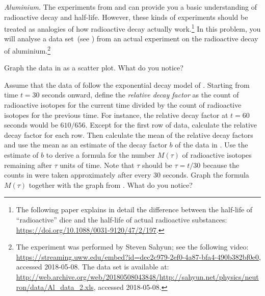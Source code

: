 \documentclass[a4paper,oneside,12pt]{article}
\begin{document}
\begin{problem}
\item\emph{Aluminium.}
  The experiments from  and
   can provide you a basic
  understanding of radioactive decay and half-life.  However, these
  kinds of experiments should be treated as analogies of how
  radioactive decay actually work.\footnote{
    The following paper explains in detail the difference between the
    half-life of ``radioactive'' dice and the half-life of actual
    radioactive substances:
    \url{https://doi.org/10.1088/0031-9120/47/2/197}.
  }
  In this problem, you will analyse a data set~(see
  ) from an actual experiment
  on the radioactive decay of aluminium.\footnote{
    The experiment was performed by Steven Sahyun; see the following
    video:
    \url{https://streaming.uww.edu/embed?id=dec2c979-2ef0-4a87-bfa4-490b382bf0e0},
    accessed 2018-05-08.  The data set is available at:
    \url{http://web.archive.org/web/20180508043848/http://sahyun.net/physics/neutron/data/Al_data_2.xls},
    accessed 2018-05-08.
  }
  \begin{packedenum}
  \item\label{subprob:aluminium_graph}
    Graph the data in  as a
    scatter plot.  What do you notice?

  \item\label{subprob:aluminium_mean_decay_factor}
    Assume that the data of 
    follow the exponential decay model of
    .  Starting from time $t = 30$
    seconds onward, define the \emph{relative decay factor} as the
    count of radioactive isotopes for the current time divided by the
    count of radioactive isotopes for the previous time.  For
    instance, the relative decay factor at $t = 60$ seconds would be
    $610 / 656$.  Except for the first row of data, calculate the
    relative decay factor for each row.  Then calculate the mean of
    the relative decay factors and use the mean as an estimate of the
    decay factor $b$ of the data in
    .  Use the estimate of $b$
    to derive a formula for the number $M(\tau)$ of radioactive
    isotopes remaining after $\tau$ units of time.  Note that $\tau$
    should be $\tau = t / 30$ because the counts in
     were taken approximately
    after every $30$ seconds.  Graph the formula $M(\tau)$ together
    with the graph from .  What do you
    notice?


\end{packedenum}
\end{problem}
\end{document}
